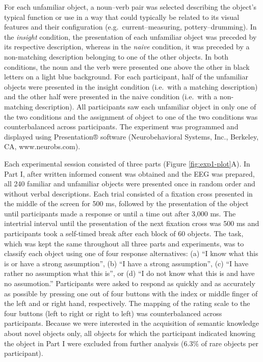 \documentclass[
  english,
  man,11pt,floatsintext]{apa7}
\begin{document}
For each unfamiliar object, a noun--verb pair was selected describing the object's typical function or use in a way that could typically be related to its visual features and their configuration (e.g.~current--measuring, pottery--drumming). In the \emph{insight} condition, the presentation of each unfamiliar object was preceded by its respective description, whereas in the \emph{naive} condition, it was preceded by a non-matching description belonging to one of the other objects. In both conditions, the noun and the verb were presented one above the other in black letters on a light blue background. For each participant, half of the unfamiliar objects were presented in the insight condition (i.e.~with a matching description) and the other half were presented in the naive condition (i.e.~with a non-matching description). All participants saw each unfamiliar object in only one of the two conditions and the assignment of object to one of the two conditions was counterbalanced across participants. The experiment was programmed and displayed using Presentation® software (Neurobehavioral Systems, Inc., Berkeley, CA, www.neurobs.com).

Each experimental session consisted of three parts (Figure \ref{fig:exp1-plot}A). In Part I, after written informed consent was obtained and the EEG was prepared, all 240 familiar and unfamiliar objects were presented once in random order and without verbal descriptions. Each trial consisted of a fixation cross presented in the middle of the screen for 500 ms, followed by the presentation of the object until participants made a response or until a time out after 3,000 ms. The intertrial interval until the presentation of the next fixation cross was 500 ms and participants took a self-timed break after each block of 60 objects. The task, which was kept the same throughout all three parts and experiments, was to classify each object using one of four response alternatives: (a) ``I know what this is or have a strong assumption'', (b) ``I have a strong assumption'', (c) ``I have rather no assumption what this is'', or (d) ``I do not know what this is and have no assumotion.'' Participants were asked to respond as quickly and as accurately as possible by pressing one out of four buttons with the index or middle finger of the left and or right hand, respectively. The mapping of the rating scale to the four buttons (left to right or right to left) was counterbalanced across participants. Because we were interested in the acquisition of semantic knowledge about novel objects only, all objects for which the participant indicated knowing the object in Part I were excluded from further analysis (6.3\% of rare objects per participant).
\end{document}
